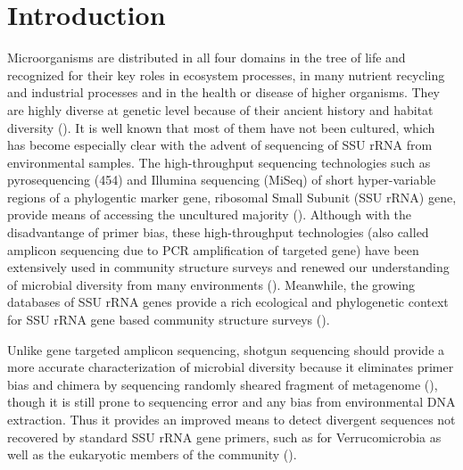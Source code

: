 \documentclass[12pt]{article}
\begin{document}
\section{Introduction}
  Microorganisms are distributed in all four domains in the tree of life and recognized for their key roles in ecosystem processes, in many nutrient recycling and industrial processes and in the health or disease of higher organisms. They are highly diverse at genetic level because of their ancient history and habitat diversity (\cite{ward2002}). It is well known that most of them have not been cultured, which has become especially clear with the advent of sequencing of SSU rRNA from environmental samples. The high-throughput sequencing technologies such as pyrosequencing (454) and Illumina sequencing (MiSeq) of short hyper-variable regions of a phylogentic marker gene, ribosomal Small Subunit (SSU rRNA) gene, provide means of accessing the uncultured majority (\cite{streit2004}). Although with the disadvantange of primer bias, these high-throughput technologies (also called amplicon sequencing due to PCR amplification of targeted gene) have been extensively used in community structure surveys and renewed our understanding of microbial diversity from many environments (\cite{huse2008,caporaso2012miseq}). Meanwhile, the growing databases of SSU rRNA genes provide a rich ecological and phylogenetic context for SSU rRNA gene based community structure surveys (\cite{rdp2009,silva2013}).

  Unlike gene targeted amplicon sequencing, shotgun sequencing should provide a more accurate characterization of microbial diversity because it eliminates primer bias and chimera by sequencing randomly sheared fragment of metagenome (\cite{chimeraslayer}), though it is still prone to sequencing error and any bias from environmental DNA extraction. Thus it provides an improved means to detect divergent sequences not recovered by standard SSU rRNA gene primers, such as for Verrucomicrobia as well as the eukaryotic members of the community (\cite{baker2003,primereva2008,verruco2011}).
\end{document}
